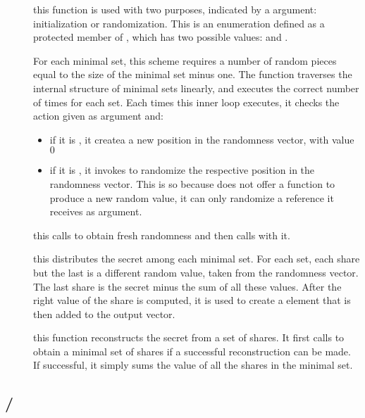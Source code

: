 \documentclass{article}
\begin{document}
\begin{description}
\item[] this function is used with two purposes, indicated by a  argument: initialization or randomization. This is an enumeration defined as a protected member of \cSS, which has two possible values:  and .

For each minimal set, this scheme requires a number of random pieces equal to the size of the minimal set minus one. The function traverses the internal structure of minimal sets linearly, and executes the correct number of times for each set. Each times this inner loop executes, it checks the action given as argument and:
\begin{itemize}
\item if it is , it createa a new position in the randomness vector, with value $0$
\item if it is , it invokes  to randomize the respective position in the randomness vector. This is so because \cPFC does not offer a function to produce a new random value, it can only randomize a reference it receives as argument.
\end{itemize}


\item[] this calls  to obtain fresh randomness and then calls  with it.
\item[] this distributes the secret among each minimal set. For each set, each share but the last is a different random value, taken from the randomness vector. The last share is the secret minus the sum of all these values. After the right value of the share is computed, it is used to create a \cST element that is then added to the output vector.

\item[] this function reconstructs the secret from a set of shares. It first calls  to obtain a minimal set of shares if a successful reconstruction can be made. If successful, it simply sums the value of all the shares in the minimal set.
\end{description}

\subsection{\fhtree / \fctree}
\end{document}

